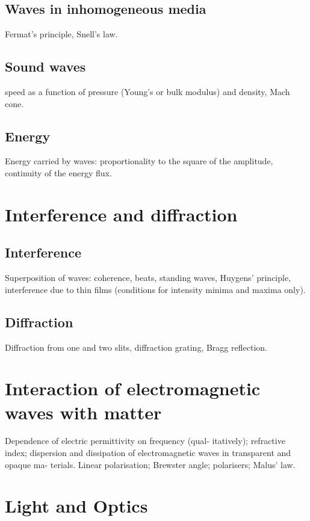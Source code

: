 \section{Waves in inhomogeneous media}
Fermat’s principle, Snell’s law.

\section{Sound waves}
speed as a function of pressure (Young’s or bulk modulus) and density, Mach cone.

\section{Energy}
Energy carried by waves: proportionality to the square of the amplitude, continuity of the energy flux.
\pagebreak

\chapter{Interference and diffraction}
\section{Interference}
Superposition of waves: coherence, beats, standing waves, Huygens’ principle, interference due to thin films (conditions for intensity minima and maxima only).

\section{Diffraction}
Diffraction from one and two slits, diffraction grating, Bragg reflection.
\pagebreak

\chapter{Interaction of electromagnetic waves with matter}
Dependence of electric permittivity on frequency (qual-
itatively); refractive index; dispersion and dissipation of
electromagnetic waves in transparent and opaque ma-
terials. Linear polarisation; Brewster angle; polarisers;
Malus’ law.
\pagebreak

\chapter{Light and Optics}
\section{}


